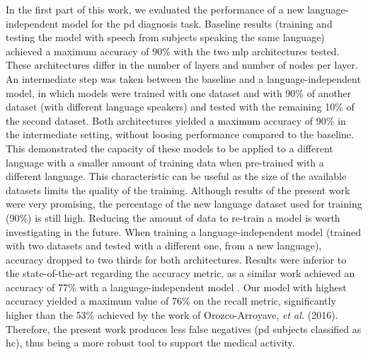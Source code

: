 In the first part of this work, we evaluated the performance of a new language-independent model for the \gls{pd} diagnosis task. Baseline results (training and testing the model with speech from subjects speaking the same language) achieved a maximum accuracy of 90\% with the two \gls{mlp} architectures tested. These architectures differ in the number of layers and number of nodes per layer. An intermediate step was taken between the baseline and a language-independent model, in which models were trained with one dataset and with 90\% of another dataset (with different language speakers) and tested with the remaining 10\% of the second dataset. Both architectures yielded a maximum accuracy of 90\% in the intermediate setting, without loosing performance compared to the baseline. This demonstrated the capacity of these models to be applied to a different language with a smaller amount of training data when pre-trained with a different language. This characteristic can be useful as the size of the available datasets limits the quality of the training. Although results of the present work were very promising, the percentage of the new language dataset used for training (90\%) is still high. Reducing the amount of data to re-train a model is worth investigating in the future. When training a language-independent model (trained with two datasets and tested with a different one, from a new language), accuracy dropped to two thirds for both architectures. Results were inferior to the state-of-the-art regarding the accuracy metric, as a similar work achieved an accuracy of 77\% with a language-independent model \cite{parkinson_three_languages}. Our model with highest accuracy yielded a maximum value of 76\% on the recall metric, significantly higher than the 53\% achieved by the work of Orozco-Arroyave, \textit{et al.} (2016). Therefore, the present work produces less false negatives (\gls{pd} subjects classified as \gls{hc}), thus being a more robust tool to support the medical activity.

